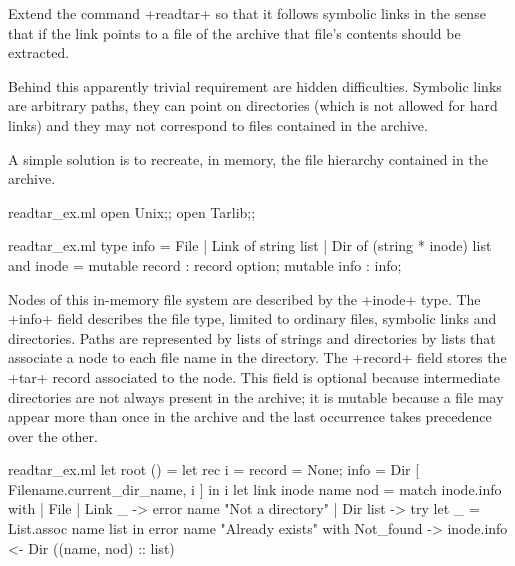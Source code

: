 \begin{exercise}\label{ex/readtar}
Extend the command \ml+readtar+ so that it follows symbolic links in
the sense that if the link points to a file of the archive that file's
contents should be extracted. 
\end{exercise}
\begin{answer}
Behind this apparently trivial requirement are hidden difficulties.
Symbolic links are arbitrary paths, they can point on directories
(which is not allowed for hard links) and they may not correspond to
files contained in the archive.

A simple solution is to recreate, in memory, the file hierarchy
contained in the archive.
%
\begin{codefile}{readtar_ex.ml}
open Unix;;
open Tarlib;;
\end{codefile}
%
\begin{listingcodefile}{readtar_ex.ml}
type info = File | Link of string list | Dir of (string * inode) list
and inode = { mutable record : record option; mutable info : info;}
\end{listingcodefile}
% 
Nodes of this in-memory file system are described by the \ml+inode+
type. The \ml+info+ field describes the file type, limited to ordinary
files, symbolic links and directories. Paths are represented by lists
of strings and directories by lists that associate a node to each file
name in the directory. The \ml+record+ field stores the \ml+tar+
record associated to the node. This field is optional because
intermediate directories are not always present in the archive; it is
mutable because a file may appear more than once in the archive and
the last occurrence takes precedence over the other.
%
\begin{listingcodefile}{readtar_ex.ml}
let root () = 
  let rec i = 
    { record = None; info = Dir [ Filename.current_dir_name, i ] }
  in i
let link inode name nod = match inode.info with
  | File | Link _ -> error name "Not a directory"
  | Dir list -> 
      try let _ = List.assoc name list in error name "Already exists"
      with Not_found -> inode.info <- Dir ((name, nod) :: list)
          

\end{listingcodefile}
\end{answer}
